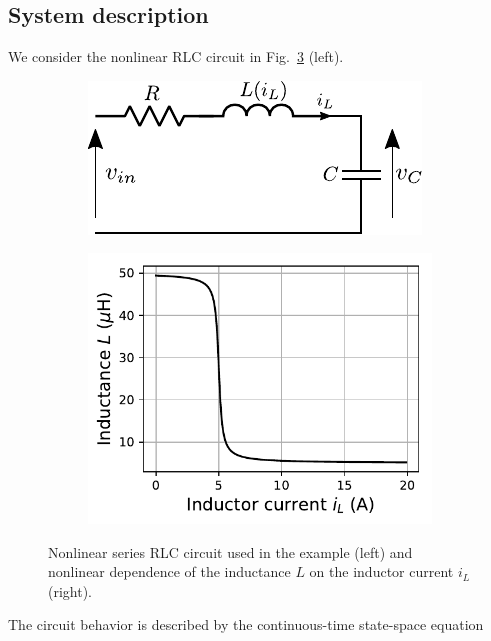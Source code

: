 \documentclass{article}
\begin{document}
\subsection{System description}
We consider the nonlinear RLC circuit in Fig.~\ref{fig:RLC} (left).
\begin{figure}
\centering
\begin{subfigure}{.4\textwidth}
  \centering
  \includegraphics[width=1.0\linewidth]{fig/RLC.pdf}
  \label{fig:sub1}
\end{subfigure}%
\begin{subfigure}{.4\textwidth}
  \centering
  \includegraphics[width=.99\linewidth]{fig/RLC_characteristics}
  \label{fig:sub2}
\end{subfigure}
\caption{Nonlinear series RLC circuit used in the example (left) and nonlinear dependence of the inductance $L$ on the  inductor current $i_L$  (right).}
\label{fig:RLC}
\end{figure}
The circuit behavior is described by the continuous-time state-space equation 
\end{document}
